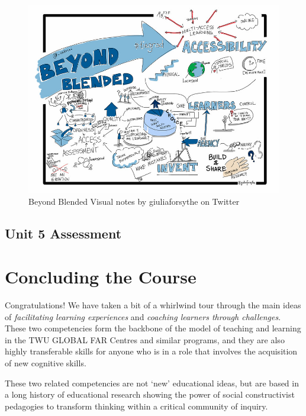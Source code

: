 \documentclass[
]{book}
\begin{document}
\begin{figure}
\centering
\includegraphics{assets/U5/U5LAImage.jpg}
\caption{Beyond Blended Visual notes by giuliaforsythe on Twitter}
\end{figure}

\hypertarget{unit-5-assessment}{%
\section*{Unit 5 Assessment}\label{unit-5-assessment}}

\hypertarget{concluding-the-course}{%
\chapter{Concluding the Course}\label{concluding-the-course}}

Congratulations! We have taken a bit of a whirlwind tour through the main ideas of \emph{facilitating learning experiences} and \emph{coaching learners through challenges}. These two competencies form the backbone of the model of teaching and learning in the TWU GLOBAL FAR Centres and similar programs, and they are also highly transferable skills for anyone who is in a role that involves the acquisition of new cognitive skills.

These two related competencies are not `new' educational ideas, but are based in a long history of educational research showing the power of social constructivist pedagogies to transform thinking within a critical community of inquiry.

  
\end{document}
